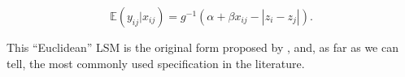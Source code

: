 \documentclass[11pt]{article}
\newcommand{\R}{\textsf{R}\space} %
\begin{document}
$$\mathbb{E}(y_{ij} | x_{ij}) = g^{-1}(\alpha + \beta x_{ij} - |z_i - z_j|).$$

This ``Euclidean'' LSM is the original form proposed by
\citet{hoff2002latent}, and, as far as we can tell, the most commonly
used specification in the literature.




\end{document}

